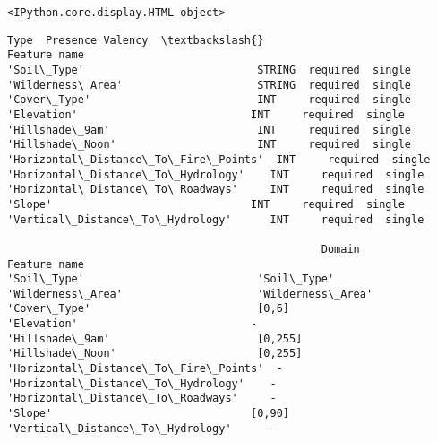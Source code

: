 \documentclass[11pt]{article}
\begin{document}
    
    \begin{Verbatim}[commandchars=\\\{\}]
<IPython.core.display.HTML object>
    \end{Verbatim}

    
    
    \begin{Verbatim}[commandchars=\\\{\}]
                                        Type  Presence Valency  \textbackslash{}
Feature name                                                     
'Soil\_Type'                           STRING  required  single   
'Wilderness\_Area'                     STRING  required  single   
'Cover\_Type'                          INT     required  single   
'Elevation'                           INT     required  single   
'Hillshade\_9am'                       INT     required  single   
'Hillshade\_Noon'                      INT     required  single   
'Horizontal\_Distance\_To\_Fire\_Points'  INT     required  single   
'Horizontal\_Distance\_To\_Hydrology'    INT     required  single   
'Horizontal\_Distance\_To\_Roadways'     INT     required  single   
'Slope'                               INT     required  single   
'Vertical\_Distance\_To\_Hydrology'      INT     required  single   

                                                 Domain  
Feature name                                             
'Soil\_Type'                           'Soil\_Type'        
'Wilderness\_Area'                     'Wilderness\_Area'  
'Cover\_Type'                          [0,6]              
'Elevation'                           -                  
'Hillshade\_9am'                       [0,255]            
'Hillshade\_Noon'                      [0,255]            
'Horizontal\_Distance\_To\_Fire\_Points'  -                  
'Horizontal\_Distance\_To\_Hydrology'    -                  
'Horizontal\_Distance\_To\_Roadways'     -                  
'Slope'                               [0,90]             
'Vertical\_Distance\_To\_Hydrology'      -                  
    \end{Verbatim}

    
    
\end{document}
